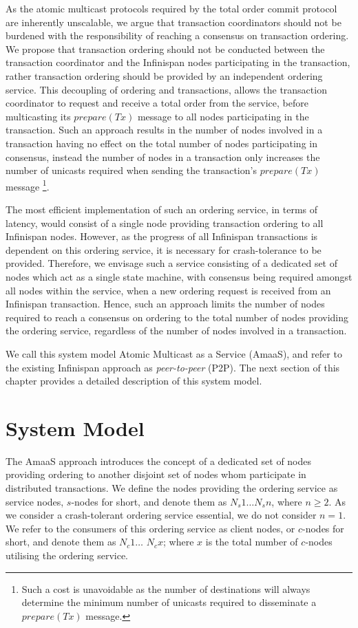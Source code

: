 As the atomic multicast protocols required by the total order commit protocol are inherently unscalable, we argue that transaction coordinators should not be burdened with the responsibility of reaching a consensus on transaction ordering.  We propose that transaction ordering should not be conducted between the transaction coordinator and the Infinispan nodes participating in the transaction, rather transaction ordering should be provided by an independent ordering service.  This decoupling of ordering and transactions, allows the transaction coordinator to request and receive a total order from the service, before multicasting its $prepare(Tx)$ message to all nodes participating in the transaction.  Such an approach results in the number of nodes involved in a transaction having no effect on the total number of nodes participating in consensus, instead the number of nodes in a transaction only increases the number of unicasts required when sending the transaction's $prepare(Tx)$ message \footnote{Such a cost is unavoidable as the number of destinations will always determine the minimum number of unicasts required to disseminate a $prepare(Tx)$ message.}.  

The most efficient implementation of such an ordering service, in terms of latency, would consist of a single node providing transaction ordering to all Infinispan nodes.  However, as the progress of all Infinispan transactions is dependent on this ordering service, it is necessary for crash-tolerance to be provided.  Therefore, we envisage such a service consisting of a dedicated set of nodes which act as a single state machine, with consensus being required amongst all nodes within the service, when a new ordering request is received from an Infinispan transaction.  Hence, such an approach limits the number of nodes required to reach a consensus on ordering to the total number of nodes providing the ordering service, regardless of the number of nodes involved in a transaction.  

We call this system model Atomic Multicast as a Service (\textsf{AmaaS}), and refer to the existing Infinispan approach as \emph{peer-to-peer} (P2P).  The next section of this chapter provides a detailed description of this system model.    	

\section{System Model}	
	The \textsf{AmaaS} approach introduces the concept of a dedicated set of nodes providing ordering to another disjoint set of nodes whom participate in distributed transactions.  We define the nodes providing the ordering service as service nodes, $s$-nodes for short, and denote them as $N_s1 \ldots N_sn$, where $n \geq 2$.  As we consider a crash-tolerant ordering service essential, we do not consider $n = 1$.  We refer to the consumers of this ordering service as client nodes, or $c$-nodes for short, and denote them as $N_c1 \ldots$ $N_cx$; where $x$ is the total number of $c$-nodes utilising the ordering service.  
		
